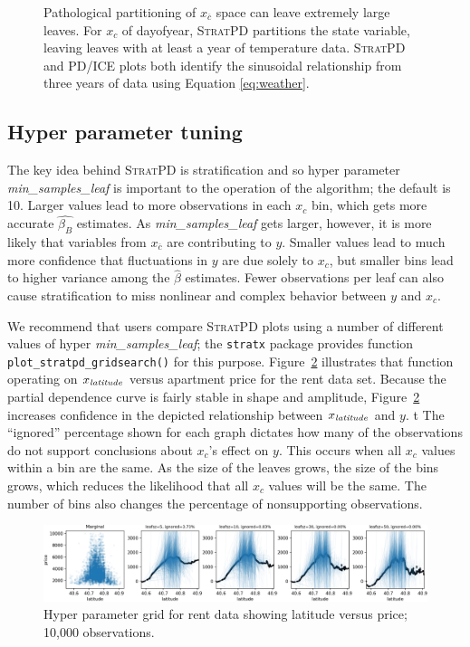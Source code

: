 \documentclass[12pt]{article}
\newcommand{\figref}[1]{Figure~\ref{#1}}
\newcommand{\spd}{\fontfamily{cmr}\textsc{\small StratPD}}
\newcommand{\xnc}{$x_{\overline{c}}$}
\begin{document}
\begin{figure}[htbp]
\begin{center}
\caption{Pathological partitioning of \xnc{} space can leave extremely large leaves. For $x_c$ of dayofyear, \spd{} partitions the state variable, leaving leaves with at least a year of temperature data. \spd{} and PD/ICE plots both identify the sinusoidal relationship from three years of data using Equation \eqref{eq:weather}.}
\label{fig:dayofyear_vs_temp}
\end{center}
\end{figure}

\subsection{Hyper parameter tuning}

The key idea behind \spd{} is stratification and so hyper parameter {\it min\_samples\_leaf} is  important to the operation of the algorithm; the default is 10. Larger values lead to more observations in each $x_c$ bin, which gets more accurate $\hat{\beta_B}$ estimates. As {\it min\_samples\_leaf} gets larger, however, it is more likely that variables from \xnc{} are contributing to $y$.  Smaller values lead to much more confidence that fluctuations in $y$ are due solely to $x_c$, but smaller bins lead to higher variance among the $\hat{\beta}$ estimates. Fewer observations per leaf can also cause stratification to miss nonlinear and complex behavior between $y$ and $x_c$.

We recommend that users compare \spd{} plots using a number of different values of hyper {\it min\_samples\_leaf}; the {\tt stratx} package provides function {\tt plot\_stratpd\_gridsearch()} for this purpose. \figref{fig:latitude_grid} illustrates that function operating on $x_{\it latitude}$ versus apartment price for the rent data set. Because the partial dependence curve is fairly stable in shape and amplitude, \figref{fig:latitude_grid} increases confidence in the depicted relationship between $x_{\it latitude}$ and $y$.
t
The ``ignored'' percentage shown for each graph dictates how many of the observations do not support conclusions about $x_c$'s effect on $y$. This occurs when all $x_c$ values within a bin are the same. As the size of the leaves grows, the size of the bins grows, which reduces the likelihood that all $x_c$ values will be the same.  The number of bins also changes the percentage of nonsupporting observations.

\begin{figure}[htbp]
\begin{center}
\includegraphics[scale=0.5]{images/latitude_meta.png}
\caption{Hyper parameter grid for rent data showing latitude versus price; 10,000 observations.}
\label{fig:latitude_grid}
\end{center}
\end{figure}
\end{document}
